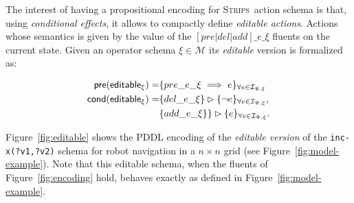 \documentclass[letterpaper]{article} %
\newcommand{\pre}{\mathsf{pre}}     %
\newcommand{\cond}{\mathsf{cond}}   %
\newcommand{\strips}{\textsc{Strips}}     %
\begin{document}
The interest of having a propositional encoding for \strips\ action schema is that, using {\em conditional effects}, it allows to compactly define {\em editable actions}. Actions whose semantics is given by the value of the $[pre|del|add]\_e\_\xi$ fluents on the current state. Given an operator schema $\xi\in\mathcal{M}$ its {\em editable} version is formalized as:
\begin{small}  
\begin{align*}
\hspace*{7pt}\pre(\mathsf{editable_{\xi}})=&\{pre\_e\_\xi\implies e\}_{\forall e\in{\mathcal I}_{\Psi,\xi}}\\
\cond(\mathsf{editable_{\xi}})=&\{del\_e\_\xi\}\rhd\{\neg e\}_{\forall e\in{\mathcal I}_{\Psi,\xi}},\\
&\{add\_e\_\xi\}\}\rhd\{e\}_{\forall e\in{\mathcal I}_{\Psi,\xi}}.
\end{align*}
\end{small}

Figure~\ref{fig:editable} shows the PDDL encoding of the {\em editable version} of the {\tt\small inc-x(?v1,?v2)} schema for robot navigation in a $n\times n$ grid (see Figure~\ref{fig:model-example}). Note that this editable schema, when the fluents of Figure~\ref{fig:encoding} hold, behaves exactly as defined in Figure~\ref{fig:model-example}. 
\end{document}
